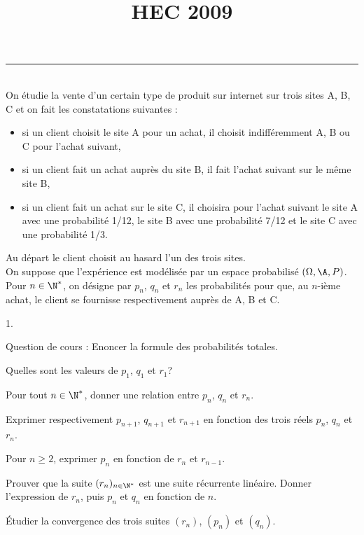 \documentclass[11pt]{article}%
\title{\bf \vspace{-1.6cm} HEC 2009} %
\author{} %
\date{} %
\begin{document}
\maketitle %
\vspace{-1.2cm}\hrule %
\thispagestyle{fancy}

\vspace*{.2cm}


\begin{exerciceAP}~\\
  On étudie la vente d'un certain type de produit sur internet sur
  trois sites A, B, C et on fait les constatations suivantes :
  \begin{itemize}
  \item si un client choisit le site A pour un achat, il choisit
    indifféremment A, B ou C pour l'achat suivant,
  \item si un client fait un achat auprès du site B, il fait l'achat
    suivant sur le même site B,
  \item si un client fait un achat sur le site C, il choisira pour
    l'achat suivant le site A avec une probabilité 1/12, le site B
    avec une probabilité 7/12 et le site C avec une probabilité 1/3.
  \end{itemize}
  Au départ le client choisit au hasard l'un des trois sites. \\
  On suppose que l'expérience est modélisée par un espace probabilisé
  $(\Omega , \A , P)$. \\
  Pour $n \in \N^*$, on désigne par $p_n$, $q_n$ et $r_n$ les
  probabilités pour que, au $n$-ième achat, le client se fournisse
  respectivement auprès de A, B et C.
  \begin{noliste}{1.}
    \setlength{\itemsep}{2mm}
  \item Question de cours : Enoncer la formule des probabilités
    totales.
  \item Quelles sont les valeurs de $p_1$, $q_1$ et $r_1$?
  \item Pour tout $n \in \N^*$, donner une relation entre $p_n$, $q_n$ et $r_n$.
  \item Exprimer respectivement $p_{n+1}$, $q_{n+1}$ et $r_{n+1}$ en
    fonction des trois réels $p_n$, $q_n$ et $r_n$.
  \item Pour $n \geq 2$, exprimer $p_n$ en fonction de $r_n$ et
    $r_{n-1}$.
  \item Prouver que la suite $(r_n)_{n \in \N^*}$ est une suite
    récurrente linéaire. Donner l'expression de $r_n$, puis $p_n$ et
    $q_n$ en fonction de $n$.
  \item Étudier la convergence des trois suites $(r_n)$, $(p_n)$ et $(q_n)$. \\
  \end{noliste}
\end{exerciceAP}
\end{document}
